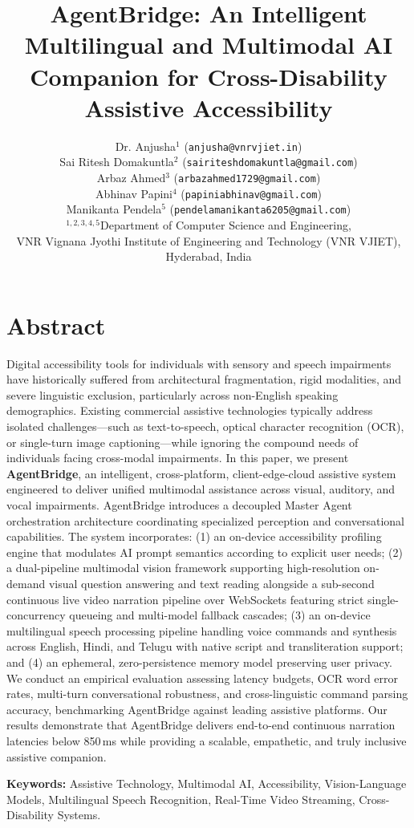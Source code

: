 \documentclass[10pt,a4paper]{article}
\title{\Large \textbf{AgentBridge: An Intelligent Multilingual and Multimodal AI Companion for Cross-Disability Assistive Accessibility}}
\author{%
\begin{tabular}{c}
\small Dr. Anjusha$^{1}$ \quad (\texttt{anjusha@vnrvjiet.in})\\[0.25em]
\small Sai Ritesh Domakuntla$^{2}$ \quad (\texttt{sairiteshdomakuntla@gmail.com})\\[0.25em]
\small Arbaz Ahmed$^{3}$ \quad (\texttt{arbazahmed1729@gmail.com})\\[0.25em]
\small Abhinav Papini$^{4}$ \quad (\texttt{papiniabhinav@gmail.com})\\[0.25em]
\small Manikanta Pendela$^{5}$ \quad (\texttt{pendelamanikanta6205@gmail.com})\\[0.5em]
\small $^{1,2,3,4,5}$Department of Computer Science and Engineering,\\
\small VNR Vignana Jyothi Institute of Engineering and Technology (VNR VJIET), Hyderabad, India
\end{tabular}}
\date{}
\begin{document}
\maketitle

\section*{Abstract}
Digital accessibility tools for individuals with sensory and speech impairments have historically suffered from architectural fragmentation, rigid modalities, and severe linguistic exclusion, particularly across non-English speaking demographics. Existing commercial assistive technologies typically address isolated challenges—such as text-to-speech, optical character recognition (OCR), or single-turn image captioning—while ignoring the compound needs of individuals facing cross-modal impairments. In this paper, we present \textbf{AgentBridge}, an intelligent, cross-platform, client-edge-cloud assistive system engineered to deliver unified multimodal assistance across visual, auditory, and vocal impairments. AgentBridge introduces a decoupled Master Agent orchestration architecture coordinating specialized perception and conversational capabilities. The system incorporates: (1) an on-device accessibility profiling engine that modulates AI prompt semantics according to explicit user needs; (2) a dual-pipeline multimodal vision framework supporting high-resolution on-demand visual question answering and text reading alongside a sub-second continuous live video narration pipeline over WebSockets featuring strict single-concurrency queueing and multi-model fallback cascades; (3) an on-device multilingual speech processing pipeline handling voice commands and synthesis across English, Hindi, and Telugu with native script and transliteration support; and (4) an ephemeral, zero-persistence memory model preserving user privacy. We conduct an empirical evaluation assessing latency budgets, OCR word error rates, multi-turn conversational robustness, and cross-linguistic command parsing accuracy, benchmarking AgentBridge against leading assistive platforms. Our results demonstrate that AgentBridge delivers end-to-end continuous narration latencies below 850\,ms while providing a scalable, empathetic, and truly inclusive assistive companion.

\noindent \textbf{Keywords:} Assistive Technology, Multimodal AI, Accessibility, Vision-Language Models, Multilingual Speech Recognition, Real-Time Video Streaming, Cross-Disability Systems.
\end{document}

